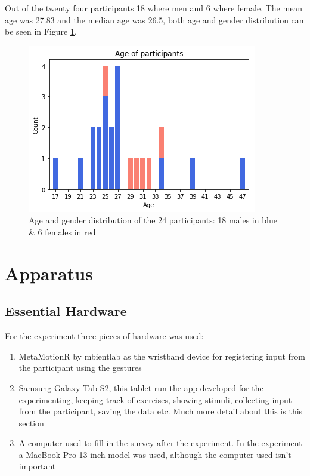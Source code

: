 Out of the twenty four participants 18 where men and 6 where female. The mean age was 27.83 and the median age was 26.5, both age and gender distribution can be seen in Figure \ref{age_gender}.

\begin{figure}[h!]
    \centering
    \includegraphics[width=.6\textwidth]{figures/age_gender.png}
    \caption{Age and gender distribution of the 24 participants: 18 males in blue \& 6 females in red}
    \label{age_gender}
\end{figure}



\section{Apparatus}
\subsection{Essential Hardware}
For the experiment three pieces of hardware was used:
\begin{enumerate}
\item MetaMotionR by mbientlab\cite{mbient} as the wristband device for registering input from the participant using the gestures
\item Samsung Galaxy Tab S2\cite{samsung}, this tablet run the app developed for the experimenting, keeping track of exercises, showing stimuli, collecting input from the participant, saving the data etc. Much more detail about this is this section
\item A computer used to fill in the survey after the experiment. In the experiment a MacBook Pro 13 inch model was used, although the computer used isn't important
\end{enumerate}

